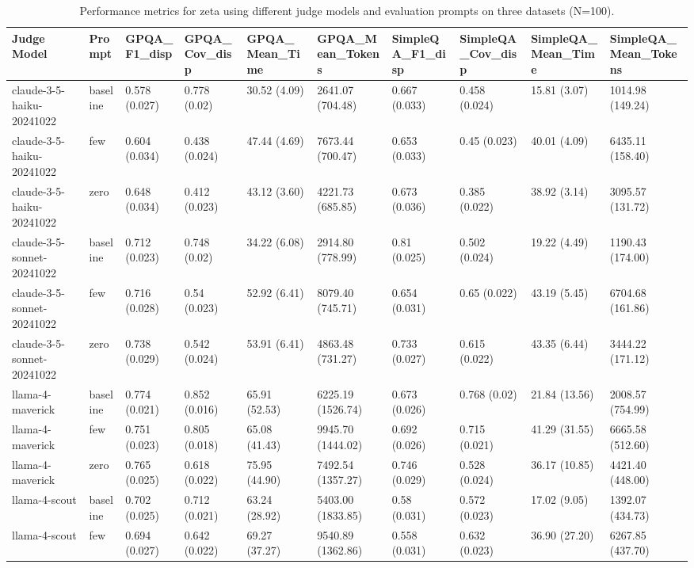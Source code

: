 \begin{table}[htbp]
\caption{Performance metrics for zeta using different judge models and evaluation prompts on three datasets (N=100).}
\label{tab:finalperf}
\begin{tabular}{llllllllll}
\toprule
Judge Model & Prompt & GPQA_F1_disp & GPQA_Cov_disp & GPQA_Mean_Time & GPQA_Mean_Tokens & SimpleQA_F1_disp & SimpleQA_Cov_disp & SimpleQA_Mean_Time & SimpleQA_Mean_Tokens \\
\midrule
claude-3-5-haiku-20241022 & baseline & 0.578 (0.027) & 0.778 (0.02) &  30.52 (4.09) & 2641.07 (704.48) & 0.667 (0.033) & 0.458 (0.024) &  15.81 (3.07) & 1014.98 (149.24) \\
claude-3-5-haiku-20241022 & few & 0.604 (0.034) & 0.438 (0.024) &  47.44 (4.69) & 7673.44 (700.47) & 0.653 (0.033) & 0.45 (0.023) &  40.01 (4.09) & 6435.11 (158.40) \\
claude-3-5-haiku-20241022 & zero & 0.648 (0.034) & 0.412 (0.023) &  43.12 (3.60) & 4221.73 (685.85) & 0.673 (0.036) & 0.385 (0.022) &  38.92 (3.14) & 3095.57 (131.72) \\
claude-3-5-sonnet-20241022 & baseline & 0.712 (0.023) & 0.748 (0.02) &  34.22 (6.08) & 2914.80 (778.99) & 0.81 (0.025) & 0.502 (0.024) &  19.22 (4.49) & 1190.43 (174.00) \\
claude-3-5-sonnet-20241022 & few & 0.716 (0.028) & 0.54 (0.023) &  52.92 (6.41) & 8079.40 (745.71) & 0.654 (0.031) & 0.65 (0.022) &  43.19 (5.45) & 6704.68 (161.86) \\
claude-3-5-sonnet-20241022 & zero & 0.738 (0.029) & 0.542 (0.024) &  53.91 (6.41) & 4863.48 (731.27) & 0.733 (0.027) & 0.615 (0.022) &  43.35 (6.44) & 3444.22 (171.12) \\
llama-4-maverick & baseline & 0.774 (0.021) & 0.852 (0.016) &  65.91 (52.53) & 6225.19 (1526.74) & 0.673 (0.026) & 0.768 (0.02) &  21.84 (13.56) & 2008.57 (754.99) \\
llama-4-maverick & few & 0.751 (0.023) & 0.805 (0.018) &  65.08 (41.43) & 9945.70 (1444.02) & 0.692 (0.026) & 0.715 (0.021) &  41.29 (31.55) & 6665.58 (512.60) \\
llama-4-maverick & zero & 0.765 (0.025) & 0.618 (0.022) &  75.95 (44.90) & 7492.54 (1357.27) & 0.746 (0.029) & 0.528 (0.024) &  36.17 (10.85) & 4421.40 (448.00) \\
llama-4-scout & baseline & 0.702 (0.025) & 0.712 (0.021) &  63.24 (28.92) & 5403.00 (1833.85) & 0.58 (0.031) & 0.572 (0.023) &  17.02 (9.05) & 1392.07 (434.73) \\
llama-4-scout & few & 0.694 (0.027) & 0.642 (0.022) &  69.27 (37.27) & 9540.89 (1362.86) & 0.558 (0.031) & 0.632 (0.023) &  36.90 (27.20) & 6267.85 (437.70) \\

\end{tabular}
\end{table}
